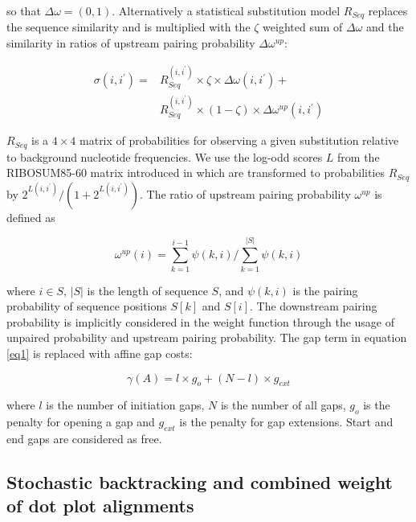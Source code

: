 \documentclass[a4paper,twoside]{article}
\begin{document}
so that $\Delta \omega = (0,1)$. Alternatively a statistical substitution model
$R_{Seq}$ replaces the sequence similarity and is multiplied with the $\zeta$
weighted sum of $\Delta \omega$ and the similarity in ratios of upstream
pairing probability $\Delta \omega^{up}$:

\begin{equation}\label{sigmar}
\begin{aligned}
	\sigma(i,i^\prime) ={} & R_{Seq}^{(i,i^\prime)} \times \zeta \times \Delta \omega(i,i^\prime) +  \\
			       & R_{Seq}^{(i,i^\prime)} \times (1-\zeta) \times
	\Delta \omega^{up}(i,i^\prime)
\end{aligned}
\end{equation}

$R_{Seq}$ is a $4\times4$ matrix of probabilities for observing
a given substitution relative to background nucleotide frequencies. We use the
log-odd scores $L$ from the RIBOSUM85-60 matrix introduced in
\cite{Klein14499004} which are transformed to probabilities $R_{Seq}$ by
$2^{L(i,i^\prime)} / (1 + 2^{L(i,i^\prime)})$. The ratio of upstream pairing probability
$\omega^{up}$ is defined as

\begin{equation}\label{eq5}
	\omega^{up}(i) = \sum_{k=1}^{i-1} \psi(k,i) /
	\sum_{k=1}^{|S|} \psi(k,i)
\end{equation}

where $i \in S$, $|S|$ is the length of sequence $S$, and $\psi(k,i)$ is the
pairing probability of sequence positions $S[k]$ and $S[i]$. The downstream
pairing probability is implicitly considered in the weight function through the
usage of unpaired probability and upstream pairing probability. The gap term
in equation \ref{eq1} is replaced with affine gap costs:

\begin{equation}\label{eq6}
	\gamma(A) = l \times g_o + (N-l) \times g_{ext}
\end{equation}
	
where $l$ is the number of initiation gaps, $N$ is the number of all gaps,
$g_o$ is the penalty for opening a gap and $g_{ext}$ is the penalty for gap
extensions. Start and end gaps are considered as free.


\subsection{Stochastic backtracking and combined weight of dot plot alignments}
\end{document}
